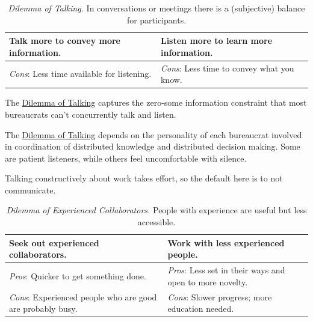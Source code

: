 \begin{center}
\begin{table}[H] %
\begin{tabular}{ | m{\dilemmatablewidth}| m{\dilemmatablewidth} | } 
  \hline
  \textbf{Talk more to convey more information.} & 
  \textbf{Listen more to learn more information.} \\ 
  \hline
  \textit{Cons}: Less time available for listening. & 
  \textit{Cons}: Less time to convey what you know. \\  
  \hline
\end{tabular}
\caption{
\textit{Dilemma of Talking.}
In conversations or meetings there is a (subjective) balance for participants.
}
\label{table:talk-or-listen}
\end{table}
\end{center}

The \href{table:talk-or-listen}{Dilemma of Talking} captures the zero-some information constraint that most bureaucrats can't concurrently talk and listen. 

The \href{table:talk-or-listen}{Dilemma of Talking} depends on the personality of each bureaucrat involved in coordination of distributed knowledge and distributed decision making. Some are patient listeners, while others feel uncomfortable with silence.

Talking constructively about work takes effort, so the default here is to not communicate. 


\begin{center}
\begin{table}[H] %
\begin{tabular}{ | m{\dilemmatablewidth}| m{\dilemmatablewidth} | } 
  \hline
  \textbf{Seek out experienced collaborators.} & 
  \textbf{Work with less experienced people.} \\ 
  \hline
  \textit{Pros}: Quicker to get something done. &
  \textit{Pros}: Less set in their ways and open to more novelty. \\  
  \hline
  \textit{Cons}: Experienced people who are good are probably busy. &
  \textit{Cons}: Slower progress; more education needed. \\  
  \hline
\end{tabular}
\caption{
\textit{Dilemma of Experienced Collaborators.}
People with experience are useful but less accessible.
}
\label{table:experience}
\end{table}
\end{center}


